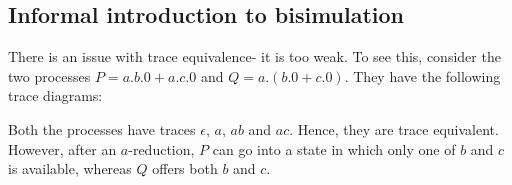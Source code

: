 \documentclass[a4paper, openany]{memoir}
\theoremstyle{definition}
\begin{document}
    \subsection{Informal introduction to bisimulation}
    There is an issue with trace equivalence- it is too weak. To see this, consider the two processes $P = a.b.0 + a.c.0$ and $Q = a.(b.0 + c.0)$. They have the following trace diagrams:
    \begin{figure}[H]
        \centering
    \end{figure}
    \noindent Both the processes have traces $\epsilon$, $a$, $ab$ and $ac$. Hence, they are trace equivalent. However, after an $a$-reduction, $P$ can go into a state in which only one of $b$ and $c$ is available, whereas $Q$ offers both $b$ and $c$. 
\end{document}
